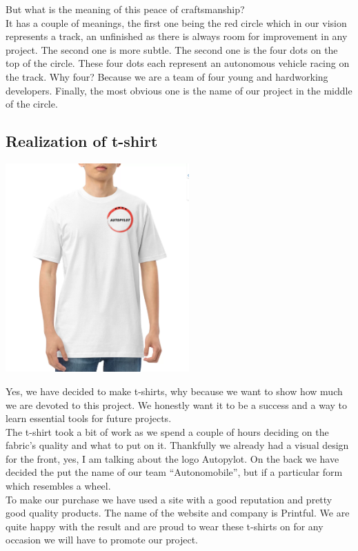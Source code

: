 \documentclass[12pt]{article}
\begin{document}
But what is the meaning of this peace of craftsmanship?\\

It has a couple of meanings, the first one being the red circle which in our vision represents a track, an unfinished as there is always room for improvement in any project. The second one is more subtle. The second one is the four dots on the top of the circle. These four dots each represent an autonomous vehicle racing on the track. Why four? Because we are a team of four young and hardworking developers. Finally, the most obvious one is the name of our project in the middle of the circle. 

\subsection{Realization of t-shirt}
\centerline{\includegraphics[height=8cm]{../../t-shirts/white_t-shirt.png}}
Yes, we have decided to make t-shirts, why because we want to show how much we are devoted to this project. We honestly want it to be a success and a way to learn essential tools for future projects.\\ 

The t-shirt took a bit of work as we spend a couple of hours deciding on the fabric’s quality and what to put on it. Thankfully we already had a visual design for the front, yes, I am talking about the logo Autopylot.  On the back we have decided the put the name of our team “Autonomobile”, but if a particular form which resembles a wheel. \\ 

To make our purchase we have used a site with a good reputation and pretty good quality products. The name of the website and company is Printful.  We are quite happy with the result and are proud to wear these t-shirts on for any occasion we will have to promote our project. 
\end{document}
